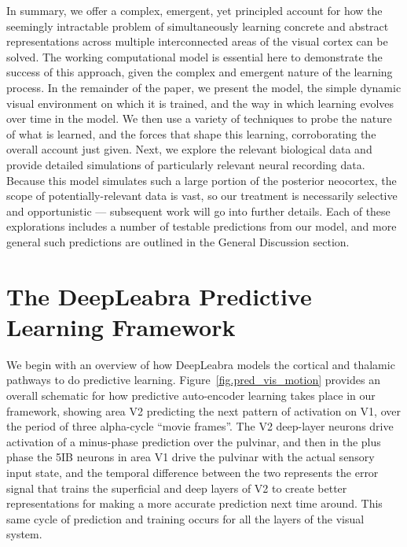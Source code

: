 \documentclass[11pt,twoside]{article}
\newif\myifpdf
\begin{document}
In summary, we offer a complex, emergent, yet principled account for how the seemingly intractable problem of simultaneously learning concrete and abstract representations across multiple interconnected areas of the visual cortex can be solved.  The working computational model is essential here to demonstrate the success of this approach, given the complex and emergent nature of the learning process.  In the remainder of the paper, we present the model, the simple dynamic visual environment on which it is trained, and the way in which learning evolves over time in the model.  We then use a variety of techniques to probe the nature of what is learned, and the forces that shape this learning, corroborating the overall account just given.  Next, we explore the relevant biological data and provide detailed simulations of particularly relevant neural recording data.  Because this model simulates such a large portion of the posterior neocortex, the scope of potentially-relevant data is vast, so our treatment is necessarily selective and opportunistic --- subsequent work will go into further details.  Each of these explorations includes a number of testable predictions from our model, and more general such predictions are outlined in the General Discussion section.  

\section{The DeepLeabra Predictive Learning Framework}

We begin with an overview of how DeepLeabra models the cortical and thalamic pathways to do predictive learning. Figure~\ref{fig.pred_vis_motion} provides an overall schematic for how predictive auto-encoder learning takes place in our framework, showing area V2 predicting the next pattern of activation on V1, over the period of three alpha-cycle ``movie frames''.  The V2 deep-layer neurons drive activation of a minus-phase prediction over the pulvinar, and then in the plus phase the 5IB neurons in area V1 drive the pulvinar with the actual sensory input state, and the temporal difference between the two represents the error signal that trains the superficial and deep layers of V2 to create better representations for making a more accurate prediction next time around. This same cycle of prediction and training occurs for all the layers of the visual system. 
\end{document}
